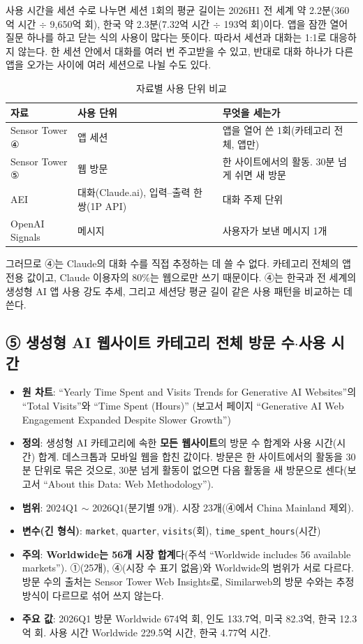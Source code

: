 \documentclass[11pt]{article}
\begin{document}
사용 시간을 세션 수로 나누면 세션 1회의 평균 길이는 2026H1 전 세계 약 2.2분(360억 시간 $\div$ 9,650억 회), 한국 약 2.3분(7.32억 시간 $\div$ 193억 회)이다. 앱을 잠깐 열어 질문 하나를 하고 닫는 식의 사용이 많다는 뜻이다. 따라서 세션과 대화는 1:1로 대응하지 않는다. 한 세션 안에서 대화를 여러 번 주고받을 수 있고, 반대로 대화 하나가 다른 앱을 오가는 사이에 여러 세션으로 나뉠 수도 있다.

\begin{longtable}{L{3.2cm}L{5.4cm}L{6.0cm}}
\caption{자료별 사용 단위 비교}\label{tab:units}\\
\toprule
자료 & 사용 단위 & 무엇을 세는가 \\
\midrule
\endhead
Sensor Tower ④ & 앱 세션 & 앱을 열어 쓴 1회(카테고리 전체, 앱만) \\
Sensor Tower ⑤ & 웹 방문 & 한 사이트에서의 활동. 30분 넘게 쉬면 새 방문 \\
AEI & 대화(Claude.ai), 입력--출력 한 쌍(1P API) & 대화 주제 단위 \\
OpenAI Signals & 메시지 & 사용자가 보낸 메시지 1개 \\
\bottomrule
\end{longtable}

그러므로 ④는 Claude의 대화 수를 직접 추정하는 데 쓸 수 없다. 카테고리 전체의 앱 전용 값이고, Claude 이용자의 80\%는 웹으로만 쓰기 때문이다. ④는 한국과 전 세계의 생성형 AI 앱 사용 강도 추세, 그리고 세션당 평균 길이 같은 사용 패턴을 비교하는 데 쓴다.

\subsection{⑤ 생성형 AI 웹사이트 카테고리 전체 방문 수$\cdot$사용 시간}

\begin{itemize}
  \item \textbf{원 차트}: ``Yearly Time Spent and Visits Trends for Generative AI Websites''의 ``Total Visits''와 ``Time Spent (Hours)'' (보고서 페이지 ``Generative AI Web Engagement Expanded Despite Slower Growth'')
  \item \textbf{정의}: 생성형 AI 카테고리에 속한 \textbf{모든 웹사이트}의 방문 수 합계와 사용 시간(시간) 합계. 데스크톱과 모바일 웹을 합친 값이다. 방문은 한 사이트에서의 활동을 30분 단위로 묶은 것으로, 30분 넘게 활동이 없으면 다음 활동을 새 방문으로 센다(보고서 ``About this Data: Web Methodology'').
  \item \textbf{범위}: 2024Q1 $\sim$ 2026Q1(분기별 9개). 시장 23개(④에서 China Mainland 제외).
  \item \textbf{변수(긴 형식)}: \texttt{market}, \texttt{quarter}, \texttt{visits}(회), \texttt{time\_spent\_hours}(시간)
  \item \textbf{주의}: \textbf{Worldwide는 56개 시장 합계}다(주석 ``Worldwide includes 56 available markets''). ①(25개), ④(시장 수 표기 없음)와 Worldwide의 범위가 서로 다르다. 방문 수의 출처는 Sensor Tower Web Insights로, Similarweb의 방문 수와는 추정 방식이 다르므로 섞어 쓰지 않는다.
  \item \textbf{주요 값}: 2026Q1 방문 Worldwide 674억 회, 인도 133.7억, 미국 82.3억, 한국 12.3억 회. 사용 시간 Worldwide 229.5억 시간, 한국 4.77억 시간.
\end{itemize}
\end{document}
